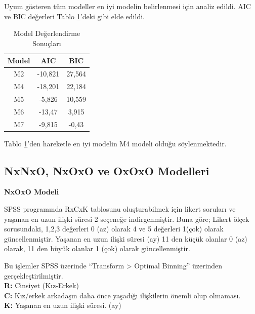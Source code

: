\documentclass{article}
\begin{document}
\vspace{10pt}
Uyum gösteren tüm modeller en iyi modelin belirlenmesi için analiz edildi. AIC ve BIC değerleri Tablo \ref{tab:model-değerlendirme}'deki gibi elde edildi.


\begin{table}[h]
    \centering
    \caption{Model Değerlendirme Sonuçları}
    \begin{tabular}{|c|c|c|}
         \hline
         \textbf{Model}& \textbf{AIC} & \textbf{BIC} \\
         \hline
         M2 & -10,821 & 27,564 \\ 
         M4 & -18,201 & 22,184 \\ 
         M5 & -5,826 & 10,559 \\ 
         M6 & -13,47 & 3,915 \\ 
         M7 & -9,815 & -0,43 \\  
         \hline
    \end{tabular}
    \label{tab:model-değerlendirme}
\end{table}

Tablo \ref{tab:model-değerlendirme}'den hareketle en iyi modelin M4 modeli olduğu söylenmektedir.

\clearpage
\subsection{ NxNxO, NxOxO ve OxOxO Modelleri}
\vspace{10pt}
\textbf{NxOxO Modeli}

\vspace{10pt}
SPSS programında RxCxK tablosunu oluşturabilmek için likert soruları ve yaşanan en uzun ilişki süresi 2 seçeneğe indirgenmiştir. Buna göre;
Likert ölçek sorusundaki, 1,2,3 değerleri 0 (az) olarak 4 ve 5 değerleri 1(çok) olarak güncellenmiştir.
Yaşanan en uzun ilişki süresi (ay) 11 den küçük olanlar 0 (az) olarak, 11 den büyük olanlar 1 (çok) olarak güncellenmiştir. 

\vspace{10pt}
Bu işlemler SPSS üzerinde “Transform > Optimal Binning” üzerinden gerçekleştirilmiştir. \\

\noindent\textbf{R:} Cinsiyet (Kız-Erkek)\\
\textbf{C:} Kız/erkek arkadaşın daha önce yaşadığı ilişkilerin önemli olup olmaması.\\
\textbf{K:} Yaşanan en uzun ilişki süresi. (ay)\\
\end{document}
